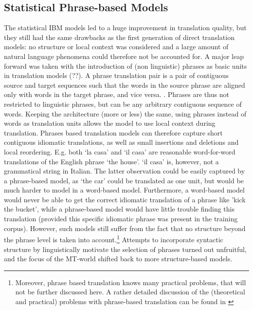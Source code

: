 \documentclass{report}
\theoremstyle{definition}
\theoremstyle{plain}
\begin{document}
\subsection{Statistical Phrase-based Models}

The statistical IBM models led to a huge improvement in translation quality, but they still had the same drawbacks as the first generation of direct translation models: no structure or local context was considered and a large amount of natural language phenomena could therefore not be accounted for. A major leap forward was taken with the introduction of (non linguistic) phrases as basic units in translation models (\cite{wang1998grammar,och1999improved}??). A phrase translation pair is a pair of contiguous source and target sequences such that the words in the source phrase are aligned only with words in the target phrase, and vice versa. \citep{och2004alignment}. Phrases are thus not restricted to linguistic phrases, but can be any arbitrary contiguous sequence of words. Keeping the architecture (more or less) the same, using phrases instead of words as translation units allows the model to use local context during translation. Phrases based translation models can therefore capture short contiguous idiomatic translations, as well as small insertions and deletions and local reordering. E.g. both `la casa' and `il casa' are reasonable word-for-word translations of the English phrase `the house'. `il casa' is, however, not a grammatical string in Italian. The latter observation could be easily captured by a phrase-based model, as `the car' could be translated as one unit, but would be much harder to model in a word-based model. Furthermore, a word-based model would never be able to get the correct idiomatic translation of a phrase like 'kick the bucket', while a phrase-based model would have little trouble finding this translation (provided this specific idiomatic phrase was present in the training corpus). However, such models still suffer from the fact that no structure beyond the phrase level is taken into account.\footnote{Moreover, phrase based translation knows many practical problems, that will not be further discussed here. A rather detailed discussion of the (theoretical and practical) problems with phrase-based translation can be found in \cite{quirk2006we}} Attempts to incorporate syntactic structure by linguistically motivate the selection of phrases \cite{koehn2003statistical} turned out unfruitful, and the focus of the MT-world shifted back to more structure-based models.
\end{document}
